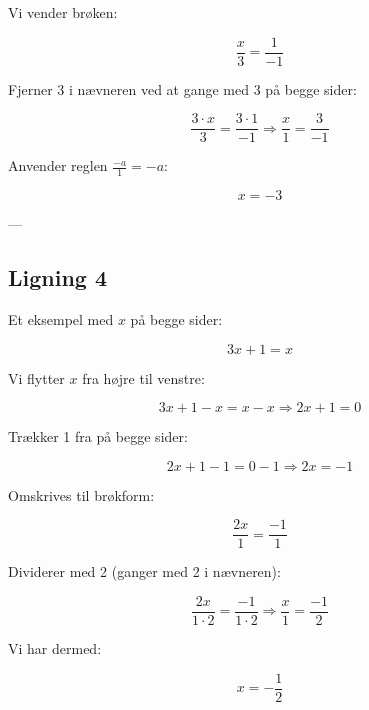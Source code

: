 Vi vender brøken:

\[
\frac{x}{3} = \frac{1}{-1}
\]

Fjerner 3 i nævneren ved at gange med 3 på begge sider:

\[
\frac{3 \cdot x}{3} = \frac{3 \cdot 1}{-1} \Rightarrow \frac{x}{1} = \frac{3}{-1}
\]

Anvender reglen \(\frac{-a}{1} = -a\):

\[
x = -3
\]

---

\subsection*{Ligning 4}
Et eksempel med $x$ på begge sider:

\[
3x + 1 = x
\]

Vi flytter $x$ fra højre til venstre:

\[
3x + 1 - x = x - x \Rightarrow 2x + 1 = 0
\]

Trækker 1 fra på begge sider:

\[
2x + 1 - 1 = 0 - 1 \Rightarrow 2x = -1
\]

Omskrives til brøkform:

\[
\frac{2x}{1} = \frac{-1}{1}
\]

Dividerer med 2 (ganger med 2 i nævneren):

\[
\frac{2x}{1 \cdot 2} = \frac{-1}{1 \cdot 2} \Rightarrow \frac{x}{1} = \frac{-1}{2}
\]

Vi har dermed:

\[
x = -\frac{1}{2}
\]